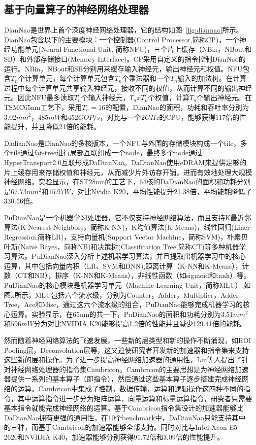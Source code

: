 \subsection{基于向量算子的神经网络处理器}
DianNao是世界上首个深度神经网络处理器，它的结构如图~\ref{fig:diannao}所示。DianNao包含以下的主要模块：一个控制器(Control Processor,简称CP)，一个神经功能单元(Neural Functional Unit, 简称NFU)，三个片上缓存（NBin，NBout和SB）和外部存储接口(Memory Interface)。CP采用自定义的指令控制DianNao的运行。NBin，NBout和SB分别用来缓存输入神经元，输出神经元和权值。NFU包含$T_n$个计算单元，每个计算单元包含$T_n$个乘法器和一个$T_n$输入的加法树。在计算过程中每个计算单元共享输入神经元，接收不同的权值，从而计算不同的输出神经元。因此NFU最多读取$T_n$个输入神经元，$T_nxT_n$个权值，计算$T_n$个输出神经元。在TSMC65nm工艺下，采用$T_n=16$的配置，DianNao的面积，功耗和吞吐率分别为$3.02mm^2$，$485mW$和$452GOP/s$，对比与一个$2GHz$的CPU，能够获得117倍的性能提升，并且降低21倍的能耗。

DadianNao是DianNao的多核版本，一个NFU与外围的存储模块构成一个tile，多个tile通过fat-tree进行局部互联组成一个node，最终多个node通过HyperTransport2.0互联形成DaDianNao。DaDianNao使用eDRAM来提供足够的片上缓存用来存储权值和神经元，从而减少片外访存开销，进而有效地处理大规模神经网络。实验显示，在ST28nm的工艺下，64核的DaDianNao的面积和功耗分别是$67.73mm^2$和$15.97W$，对比Nvidia K20，平均性能提升21.38倍，平均能耗降低了330.56倍。

PuDianNao是一个机器学习处理器，它不仅支持神经网络算法，而且支持K最近邻算法(K-Nearest Neighbors，简称K-NN)，K均值算法(K-Means)，线性回归(Liner Regression,简称LR)，支持向量机(Support Vector Machine，简称SVM)，朴素贝叶斯(Naive Bayes，简称NB)和决策树(Classification Tree,简称CT)等多种机器学习算法。PuDianNao深入分析上述机器学习算法，并且提取出机器学习中的核心运算，其中包括向量内积（LR、SVM和DNN),距离计算（K-NN和K-Means），计数（CT和NB），排序（K-NN和K-Means），非线性函数（如sigmoid和tanh）等。PuDianNao的核心模块是机器学习单元（Machine Learning Unit，简称MLU）,如图x所示，MLU包括六个流水级，分别为Counter，Adder，Multiplier，Adder Tree，Acc和Misc，通过这六个流水级的组合，PuDianNao能够完成机器学习的核心运算。实验显示，在65nm的共一下，PuDianNao的面积和功耗分别为$3.51mm^2$和$596mW$分为对比NVIDIA K20能够提高1.2倍的性能并且减少129.41倍的能耗。

然而随着神经网络算法的飞速发展，一些新的层类型和新的操作不断涌现，如ROI Pooling层，Deconvolution层等，这又迫使研究者开发新的加速器和指令集来支持这些新的层和操作。为了进一步提高神经网络加速器的通用性，Liu等人提出了针对神经网络处理器的指令集Cambricon。Cambricon的主要思想是为神经网络加速器提供一系列的基本算子（即指令），然后通过这些基本算子逐步搭建完成神经网络的运算。Cambricon中集成了控制，数据传输，运算和逻辑操作这四种不同的指令，其中运算指令进一步分为矩阵运算，向量运算和标量运算指令，研究者只需要基本指令就能完成神经网络的运算。基于Cambricon指令集设计的加速器能够比DaDianNao拥有更强的通用性，在10个benchmark中，DaDianNao只能支持其中的三种，而基于Cambricon的加速器能够全部支持。同时对比与Intel Xeon E5-2620和NVIDIA K40，加速器能够分别获得91.72倍和3.09倍的性能提升。

